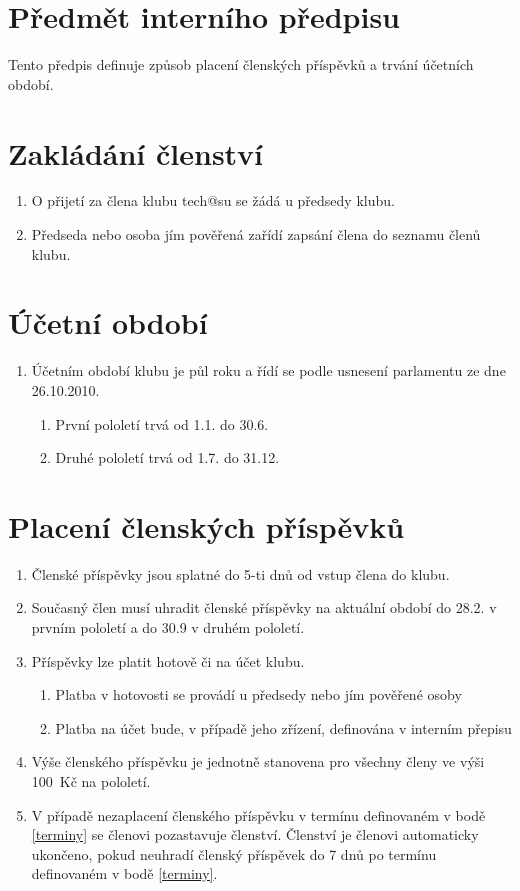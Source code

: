 \documentclass[10pt]{article}
\begin{document}
\section{Předmět interního předpisu}
	Tento předpis definuje způsob placení členských příspěvků a trvání účetních období.

\section{Zakládání členství}
	\begin{enumerate}
		\item O přijetí za člena klubu tech@su se žádá u předsedy klubu.
		\item Předseda nebo osoba jím pověřená zařídí zapsání člena do seznamu členů klubu.
	\end{enumerate}
\section{Účetní období}
	\begin{enumerate}
		\item Účetním období klubu je půl roku a řídí se podle usnesení parlamentu ze dne 26.10.2010.
		\begin{enumerate}
			\item První pololetí trvá od 1.1. do 30.6.
			\item Druhé pololetí trvá od 1.7. do 31.12.
		\end{enumerate}
	\end{enumerate}
\section{Placení členských příspěvků}
	\begin{enumerate}
		\item Členské příspěvky jsou splatné do 5-ti dnů od vstup člena do klubu.
		\item \label{terminy} Současný člen musí uhradit členské příspěvky na aktuální období do 28.2. v prvním pololetí a do 30.9 v druhém pololetí.

		\item Příspěvky lze platit hotově či na účet klubu.
			\begin{enumerate}
				\item Platba v hotovosti se provádí u předsedy nebo jím pověřené osoby
				\item Platba na účet bude, v případě jeho zřízení, definována v interním přepisu
			\end{enumerate}
		\item Výše členského příspěvku je jednotně stanovena pro všechny členy ve výši 100~Kč na pololetí.
		\item V případě nezaplacení členského příspěvku v termínu definovaném v bodě \ref{terminy} se členovi pozastavuje členství. Členství je členovi automaticky ukončeno, pokud neuhradí členský příspěvek do 7 dnů po termínu definovaném v bodě \ref{terminy}.

	\end{enumerate}
\end{document}
